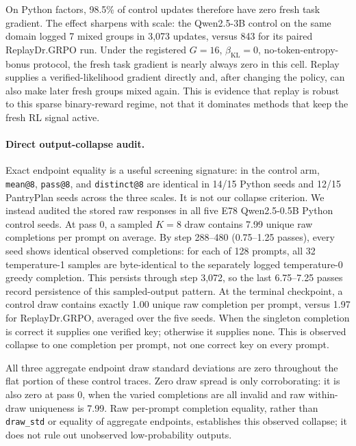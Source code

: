 \documentclass{article}
\newcommand{\1}{\mathbf 1}
\theoremstyle{remark}
\theoremstyle{definition}
\theoremstyle{plain}
\begin{document}
On Python factors, 98.5\% of control updates therefore have zero
fresh task gradient. The effect sharpens with scale: the Qwen2.5-3B control
on the same domain logged 7 mixed groups in 3{,}073 updates, versus 843 for its
paired ReplayDr.GRPO run. Under the registered \(G=16\),
\(\beta_{\mathrm{KL}}=0\), no-token-entropy-bonus protocol, the fresh task gradient
is nearly always zero in this cell. Replay supplies a verified-likelihood
gradient directly and, after changing the policy, can also make later fresh
groups mixed again. This is evidence that replay is robust to this sparse
binary-reward regime, not that it dominates methods that keep the fresh RL
signal active.

\paragraph{Direct output-collapse audit.}
Exact endpoint equality is a useful screening signature: in the control arm,
\texttt{mean@8}, \texttt{pass@8}, and \texttt{distinct@8} are identical in
14/15 Python seeds and 12/15 PantryPlan seeds across the three scales. It is not
our collapse criterion. We instead audited the stored raw responses in all five
E78 Qwen2.5-0.5B Python control seeds. At pass 0, a sampled \(K=8\) draw contains
7.99 unique raw completions per prompt on average. By step 288--480
(0.75--1.25 passes), every seed shows identical observed completions: for each
of 128 prompts, all 32 temperature-1 samples are byte-identical to the
separately logged temperature-0 greedy completion. This persists through step 3,072, so the last
6.75--7.25 passes record persistence of this sampled-output pattern. At the
terminal checkpoint, a control draw contains exactly 1.00 unique raw completion
per prompt, versus 1.97 for ReplayDr.GRPO, averaged over the five seeds. When the
singleton completion is correct it supplies one verified key; otherwise it
supplies none. This is observed collapse to one completion per prompt, not one
correct key on every prompt.

All three aggregate endpoint draw standard deviations are zero throughout the
flat portion of these control traces. Zero draw spread is only corroborating:
it is also zero at pass 0, when the varied completions are all invalid and raw
within-draw uniqueness is 7.99. Raw per-prompt completion equality, rather than
\texttt{draw\_std} or equality of aggregate endpoints, establishes this
observed collapse; it does not rule out unobserved low-probability outputs.
\end{document}
